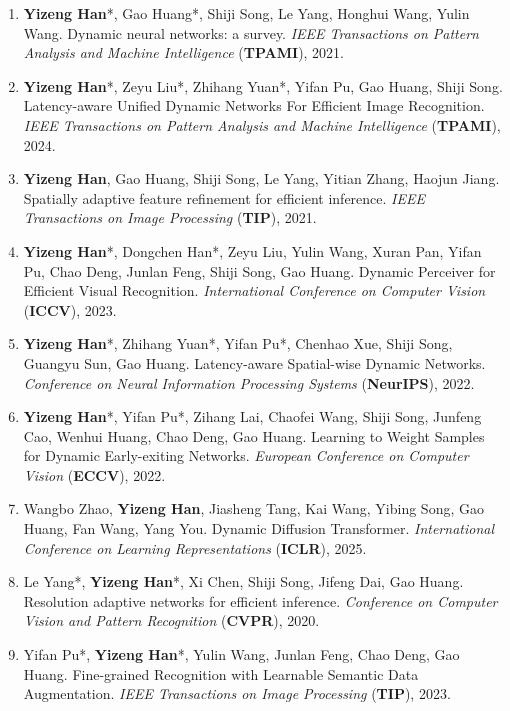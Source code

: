 \documentclass[10.5pt]{article}
\makeatletter
\newlength{\bibhang}
\newlength{\bibsep}
 {\@listi \global\bibsep\itemsep \global\advance\bibsep by\parsep}
\newenvironment{bibsection}%
        {\begin{enumerate}{%
       \setlength{\leftmargin}{-2em}%
       \setlength{\itemindent}{-2em}%
       \setlength{\itemsep}{\bibsep}%
        \setlength{\partopsep}{0pt}%
        \setlength{\topsep}{0pt}}}
        {\end{enumerate}\vspace{-.6\baselineskip}}
\makeatother
\begin{document}
\begin{sloppypar}
\begin{bibsection}
        \item \textbf{Yizeng Han}*, {Gao Huang*}, Shiji Song, Le Yang, Honghui Wang, Yulin Wang. Dynamic neural networks: a survey. \emph{IEEE Transactions on Pattern Analysis and Machine Intelligence} (\textbf{TPAMI}), 2021.
        \item \textbf{Yizeng Han}*, Zeyu Liu*, Zhihang Yuan*, Yifan Pu, Gao Huang, Shiji Song. Latency-aware Unified Dynamic Networks For Efficient Image Recognition. \emph{IEEE Transactions on Pattern Analysis and Machine Intelligence} (\textbf{TPAMI}), 2024.
        \item \textbf{Yizeng Han}, {Gao Huang}, Shiji Song, Le Yang, Yitian Zhang, Haojun Jiang. Spatially adaptive feature refinement for efficient inference. \emph{IEEE Transactions on Image Processing} (\textbf{TIP}), 2021.
        \item \textbf{Yizeng Han}*, Dongchen Han*, Zeyu Liu, Yulin Wang, Xuran Pan, Yifan Pu, Chao Deng, Junlan Feng, Shiji Song, Gao Huang. Dynamic Perceiver for Efficient Visual Recognition. \emph{International Conference on Computer Vision} (\textbf{ICCV}), 2023.
        \item \textbf{Yizeng Han}*, {Zhihang Yuan*}, {Yifan Pu*}, Chenhao Xue, Shiji Song, Guangyu Sun, Gao Huang. Latency-aware Spatial-wise Dynamic Networks. \emph{Conference on Neural Information Processing Systems} (\textbf{NeurIPS}), 2022.
        \item \textbf{Yizeng Han}*, {Yifan Pu*}, Zihang Lai, Chaofei Wang, Shiji Song, Junfeng Cao, Wenhui Huang, Chao Deng, Gao Huang. Learning to Weight Samples for Dynamic Early-exiting Networks. \emph{European Conference on Computer Vision} (\textbf{ECCV}), 2022.
        \item Wangbo Zhao, \textbf{Yizeng Han}, Jiasheng Tang, Kai Wang, Yibing Song, Gao Huang, Fan Wang, Yang You. Dynamic Diffusion Transformer. \emph{International Conference on Learning Representations} (\textbf{ICLR}), 2025.
        \item {Le Yang*}, \textbf{Yizeng Han}*, Xi Chen, Shiji Song, Jifeng Dai, Gao Huang. Resolution adaptive networks for efficient inference. \emph{Conference on Computer Vision and Pattern Recognition} (\textbf{CVPR}), 2020.
        \item Yifan Pu*, \textbf{Yizeng Han}*,  Yulin Wang, Junlan Feng, Chao Deng, Gao Huang. Fine-grained Recognition with Learnable Semantic Data Augmentation. \emph{IEEE Transactions on Image Processing} (\textbf{TIP}), 2023.

\end{bibsection}
\end{sloppypar}
\end{document}
